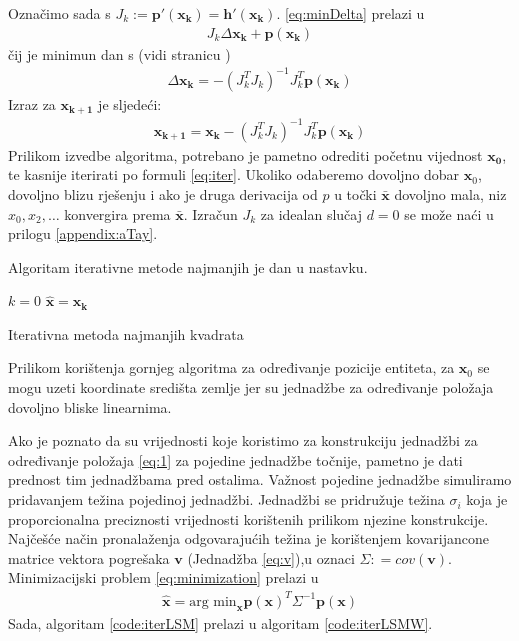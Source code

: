 \documentclass[a4paper,twoside,12pt]{memoir} %
\begin{document}
Označimo sada s $J_k := \mathbf{p}'(\mathbf{x_k}) = \mathbf{h}'(\mathbf{x_k})$.
\ref{eq:minDelta} prelazi u 
\begin{align}\label{eq:minDelta2}
	J_k \Delta \mathbf{x_k} +\mathbf{p}(\mathbf{x_k})
\end{align}
čij je minimun dan s (vidi stranicu \pageref{stranica:nastavakLS})  
\begin{align}\label{eq:minDeltaRj}
\Delta \mathbf{x_k} = - (J_k^TJ_k)^{-1}J_k^T \mathbf{p}(\mathbf{x_k})
\end{align}
Izraz za $\mathbf{x_{k+1}}$ je sljedeći:
\begin{align}\label{eq:iter}
	\mathbf{x_{k+1}} = \mathbf{x_{k}} - (J_k^TJ_k)^{-1}J_k^T \mathbf{p}(\mathbf{x_k})
\end{align}
Prilikom izvedbe algoritma, potrebano je pametno odrediti početnu vijednost $\mathbf{x_0}$, te kasnije iterirati po formuli \ref{eq:iter}.
Ukoliko odaberemo dovoljno dobar $\mathbf{x}_0$, dovoljno blizu rješenju i
ako je druga derivacija od $p$ u točki $\bar{\mathbf{x}}$ dovoljno mala,
niz $x_0,x_2, \hdots$ konvergira prema $\bar{\mathbf{x}}$. Izračun $J_k$ za idealan slučaj $d = 0$ se može naći u prilogu \ref{appendix:aTay}.

Algoritam iterativne metode najmanjih je dan u nastavku.

\begin{algorithm}[H]
	$k = 0$ \;
	$\hat{\mathbf{x}} = \mathbf{x_k}$
\caption{Iterativna metoda najmanjih kvadrata}
\label{code:iterLSM}
\end{algorithm}

Prilikom korištenja gornjeg algoritma za određivanje pozicije entiteta, za $\mathbf{x}_0$ se mogu uzeti koordinate središta zemlje jer su jednadžbe za određivanje položaja dovoljno bliske linearnima.

Ako je poznato da su vrijednosti koje koristimo za konstrukciju
jednadžbi za određivanje položaja \ref{eq:1} za pojedine jednadžbe točnije,
pametno je dati prednost tim jednadžbama pred ostalima.
Važnost pojedine jednadžbe simuliramo pridavanjem težina pojedinoj jednadžbi.
Jednadžbi se pridružuje težina $\sigma_i$ koja je proporcionalna preciznosti 
vrijednosti korištenih prilikom njezine konstrukcije.
Najčešće način pronalaženja odgovarajućih težina je
korištenjem kovarijancone matrice
vektora pogrešaka $\mathbf{v}$ (Jednadžba \ref{eq:v}),u oznaci $\Sigma : = cov(\mathbf{v})$. Minimizacijski problem \ref{eq:minimization} prelazi u %
\begin{align}\label{eq:minimisation2}
\hat{\mathbf{x}} = \text{arg min}_\mathbf{x} \mathbf{p}(\mathbf{x})^T \Sigma^{-1} \mathbf{p}(\mathbf{x})
\end{align}%
Sada, algoritam \ref{code:iterLSM} prelazi u algoritam \ref{code:iterLSMW}.
\end{document}
